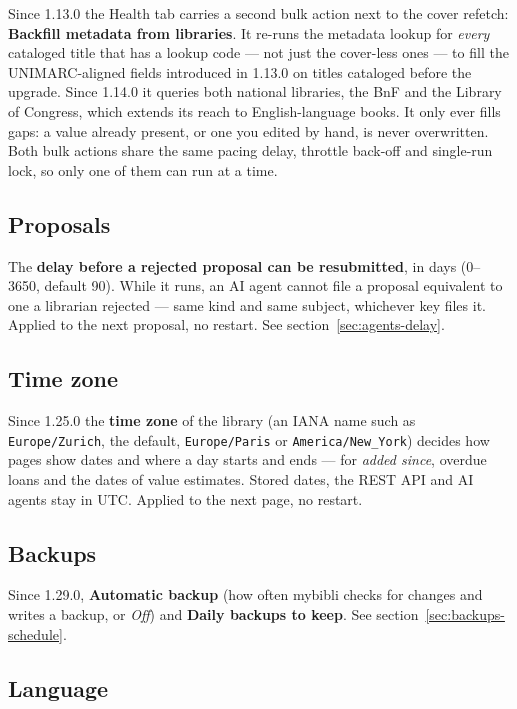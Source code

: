 Since 1.13.0 the Health tab carries a second bulk action next to the
cover refetch: \textbf{Backfill metadata from libraries}. It re-runs
the metadata lookup for \emph{every} cataloged title that has a lookup
code — not just the cover-less ones — to fill the UNIMARC-aligned
fields introduced in 1.13.0 on titles cataloged before the upgrade.
Since 1.14.0 it queries both national libraries, the BnF and the
Library of Congress, which extends its reach to English-language
books.
It only ever fills gaps: a value already present, or one you edited
by hand, is never overwritten. Both bulk actions share the same
pacing delay, throttle back-off and single-run lock, so only one of
them can run at a time.

\subsection*{Proposals}

The \textbf{delay before a rejected proposal can be resubmitted}, in
days (0--3650, default 90). While it runs, an AI agent cannot file a
proposal equivalent to one a librarian rejected --- same kind and same
subject, whichever key files it. Applied to the next proposal, no
restart. See section~\ref{sec:agents-delay}.

\subsection*{Time zone}

Since 1.25.0 the \textbf{time zone} of the library (an IANA name such
as \texttt{Europe/Zurich}, the default, \texttt{Europe/Paris} or
\texttt{America/New\_York}) decides how pages show dates and where a
day starts and ends --- for \emph{added since}, overdue loans and the
dates of value estimates. Stored dates, the REST API and AI agents stay
in UTC. Applied to the next page, no restart.

\subsection*{Backups}

Since 1.29.0, \textbf{Automatic backup} (how often mybibli checks for
changes and writes a backup, or \emph{Off}) and \textbf{Daily backups
to keep}. See section~\ref{sec:backups-schedule}.

\subsection*{Language}

